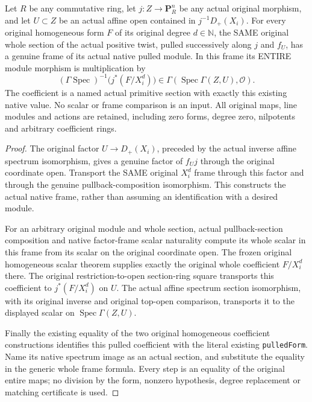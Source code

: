 \begin{lemma}
\label{lem:resume-original-form-affine-spec-scalar}
\leanok
Let $R$ be any commutative ring, let $j:Z\to\mathbf P_R^n$ be any
actual original morphism, and let $U\subset Z$ be an actual affine open
contained in $j^{-1}D_+(X_i)$.  For every original homogeneous form $F$
of its original degree $d\in\mathbb N$, the SAME original whole
section of the actual positive twist, pulled successively along $j$
and $f_U$, has a genuine frame of its actual native pulled module.
In this frame its ENTIRE module morphism is multiplication by
\[
 (\Gamma\operatorname{Spec})^{-1}\bigl(j^*(F/X_i^d)\bigr)
 \in\Gamma(\operatorname{Spec}\Gamma(Z,U),\mathcal O).
\]
The coefficient is a named actual primitive section with exactly this
existing native value.  No scalar or frame comparison is an input.
All original maps, line modules and actions are retained, including
zero forms, degree zero, nilpotents and arbitrary coefficient rings.
\end{lemma}
\begin{proof}
The original factor $U\to D_+(X_i)$, preceded by the actual inverse
affine spectrum isomorphism, gives a genuine factor of $f_Uj$ through
the original coordinate open.  Transport the SAME original $X_i^d$
frame through this factor and through the genuine pullback-composition
isomorphism.  This constructs the actual native frame, rather than
assuming an identification with a desired module.

For an arbitrary original module and whole section, actual
pullback-section composition and native factor-frame scalar naturality
compute its whole scalar in this frame from its scalar on the original
coordinate open.  The frozen original homogeneous scalar theorem
supplies exactly the original whole coefficient $F/X_i^d$ there.
The original restriction-to-open section-ring square transports this
coefficient to $j^*(F/X_i^d)$ on $U$.  The actual affine spectrum
section isomorphism, with its original inverse and original top-open
comparison, transports it to the displayed scalar on
$\operatorname{Spec}\Gamma(Z,U)$.

Finally the existing equality of the two original homogeneous
coefficient constructions identifies this pulled coefficient with the
literal existing \texttt{pulledForm}.  Name its native spectrum image
as an actual section, and substitute the equality in the generic whole
frame formula.  Every step is an equality of the original entire maps;
no division by the form, nonzero hypothesis, degree replacement or
matching certificate is used.
\end{proof}
